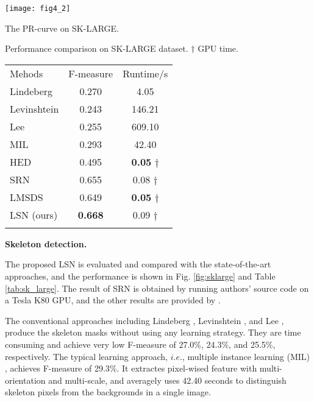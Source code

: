 \documentclass[runningheads]{llncs}
\begin{document}
{
\setlength\parindent{-0.5em}
\begin{minipage}{.48\textwidth}
\centering
\texttt{[image: fig4\_2]}
\makeatletter\def\@captype{figure}\makeatother
\caption{The PR-curve on SK-LARGE.  }
\end{minipage} \quad
\begin{minipage}{.49\textwidth}
  \makeatletter{}\makeatother
  \caption{Performance comparison  on SK-LARGE dataset. $\dagger$ GPU time.}
  \begin{tabular}{lcc}
    \hline
    Mehods & F-measure & Runtime/s \\
    \noalign{\smallskip}
    \hline
    \noalign{\smallskip}
    Lindeberg \cite{ref37} &	0.270 &	4.05 \\
    Levinshtein \cite{ref12} &	0.243 &	146.21 \\
    Lee \cite{ref13} &	0.255 &	609.10 \\
    MIL \cite{ref15} &	0.293 &	42.40 \\
    \hline
    HED \cite{ref6} &	0.495 &	\textbf{0.05} $\dagger$ \\
    SRN \cite{ref1} &	0.655 &	0.08 $\dagger$ \\
    LMSDS \cite{ref33} &	0.649 &	\textbf{0.05} $\dagger$ \\
    LSN (ours) & \textbf{0.668} &	0.09 $\dagger$ \\
    \hline
    \label{tab:sk_large}
  \end{tabular}
  \label{fig:sklarge}
\end{minipage}
}


\textbf{Skeleton detection.} 

The proposed LSN is evaluated and compared with the state-of-the-art approaches, and the performance is shown in Fig. \ref{fig:sklarge} and Table \ref{tab:sk_large}. The result of SRN \cite{ref1} is obtained by running authors' source code on a Tesla K80 GPU, and the other results are provided by \cite{ref33}.

The conventional approaches including Lindeberg \cite{ref37}, Levinshtein \cite{ref12}, and Lee \cite{ref13}, produce the skeleton masks without using any learning strategy. They are time consuming and achieve very low F-measure of 27.0\%, 24.3\%, and 25.5\%, respectively. The typical learning approach, $i.e.$, multiple instance learning (MIL) \cite{ref15}, achieves F-measure of 29.3\%. It extractes pixel-wised feature with multi-orientation and multi-scale, and averagely uses 42.40 seconds to distinguish skeleton pixels from the backgrounds in a single image.
\end{document}
